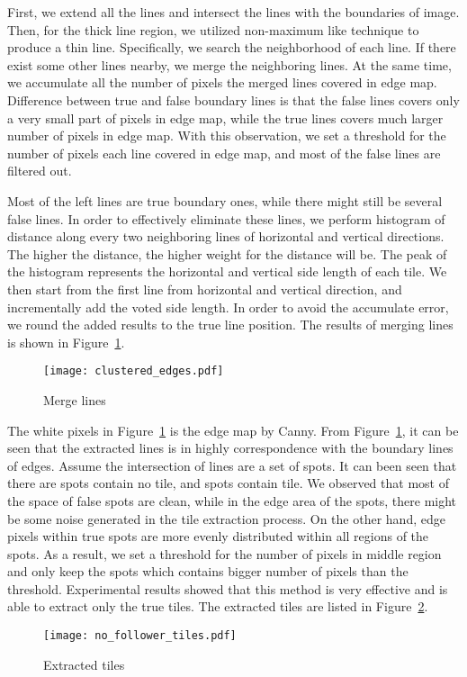 \begin{enumerate}
			First, we extend all the lines and intersect the lines with the boundaries of image. Then, for 
			the thick line region, we utilized non-maximum like technique to produce a thin line. Specifically, 
			we search the neighborhood of each line. If there exist some other lines nearby, we merge the 
			neighboring lines. At the same time, we accumulate all the number of pixels the merged lines covered in edge map. 
			Difference between true and false boundary lines is that the false lines covers 
			only a very small part of pixels in edge map, while the true lines covers much larger number of pixels 
			in edge map. With this observation, we set a threshold for the number of pixels each line covered in edge 
			map, and most of the false lines are filtered out. 
			
			Most of the left lines are true boundary ones, while there might still be several false 
			lines. In order to effectively eliminate these lines, we perform histogram of distance along every two 
			neighboring lines of horizontal and vertical directions. The higher the distance, the higher weight 
			for the distance will be. The peak of the histogram represents the horizontal and vertical side length 
			of each tile. We then start from the first line from horizontal and vertical direction, and 
			incrementally add the voted side length. In order to avoid the accumulate error, we round the added 
			results to the true line position. The results of merging lines is shown in Figure~\ref{Merge_line}. 
			
			\begin{figure}[htbp]
				  \centering
				  \texttt{[image: clustered\_edges.pdf]}
				  \caption{Merge lines}
				  \label{Merge_line}
			\end{figure}
\end{enumerate}
	The white pixels in Figure~\ref{Merge_line} is the edge map by Canny. From Figure~\ref{Merge_line}, it can be 
	seen that the extracted lines is in highly correspondence with the boundary 
	lines of edges. Assume the intersection of lines are a set of spots. It can been seen that there are spots contain
	no tile, and spots contain tile. We observed that most of the 
	space of false spots are clean, while in the edge area of the spots, there might be some noise generated in the 
	tile extraction process. On the other hand, edge pixels within true spots are more evenly distributed within all regions of 
	the spots. As a result, we set a threshold for the number of pixels in middle region and only keep the spots which contains 
	bigger number of pixels than the threshold. Experimental results showed that this method is very effective and is able to 
	extract only the true tiles. The extracted tiles are listed in Figure~\ref{ex_tiles}.
	
	\begin{figure}[htbp]
		  \centering
		  \texttt{[image: no\_follower\_tiles.pdf]}
		  \caption{Extracted tiles}
		  \label{ex_tiles}
	\end{figure}